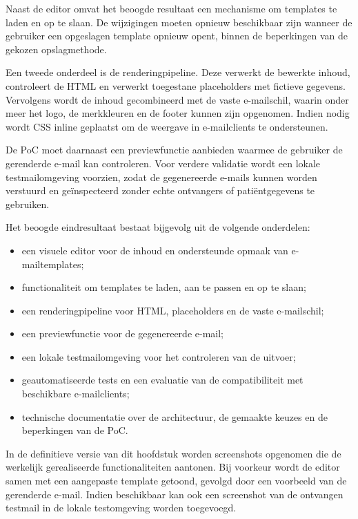 Naast de editor omvat het beoogde resultaat een mechanisme om templates
te laden en op te slaan. De wijzigingen moeten opnieuw beschikbaar zijn
wanneer de gebruiker een opgeslagen template opnieuw opent, binnen de
beperkingen van de gekozen opslagmethode.

Een tweede onderdeel is de renderingpipeline. Deze verwerkt de bewerkte
inhoud, controleert de HTML en verwerkt toegestane placeholders met
fictieve gegevens. Vervolgens wordt de inhoud gecombineerd met de vaste
e-mailschil, waarin onder meer het logo, de merkkleuren en de footer kunnen
zijn opgenomen. Indien nodig wordt CSS inline geplaatst om de weergave in
e-mailclients te ondersteunen.

De PoC moet daarnaast een previewfunctie aanbieden waarmee de gebruiker de
gerenderde e-mail kan controleren. Voor verdere validatie wordt een lokale
testmailomgeving voorzien, zodat de gegenereerde e-mails kunnen worden
verstuurd en geïnspecteerd zonder echte ontvangers of patiëntgegevens te
gebruiken.

Het beoogde eindresultaat bestaat bijgevolg uit de volgende onderdelen:

\begin{itemize}
    \item een visuele editor voor de inhoud en ondersteunde opmaak van
    e-mailtemplates;
    \item functionaliteit om templates te laden, aan te passen en op te slaan;
    \item een renderingpipeline voor HTML, placeholders en de vaste e-mailschil;
    \item een previewfunctie voor de gegenereerde e-mail;
    \item een lokale testmailomgeving voor het controleren van de uitvoer;
    \item geautomatiseerde tests en een evaluatie van de compatibiliteit
    met beschikbare e-mailclients;
    \item technische documentatie over de architectuur, de gemaakte keuzes
    en de beperkingen van de PoC.
\end{itemize}

In de definitieve versie van dit hoofdstuk worden screenshots opgenomen
die de werkelijk gerealiseerde functionaliteiten aantonen. Bij voorkeur
wordt de editor samen met een aangepaste template getoond, gevolgd door
een voorbeeld van de gerenderde e-mail. Indien beschikbaar kan ook een
screenshot van de ontvangen testmail in de lokale testomgeving worden
toegevoegd.

